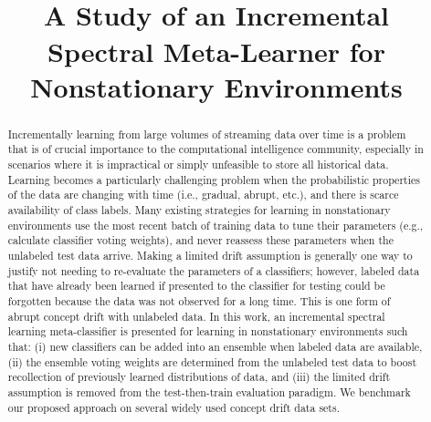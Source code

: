 \documentclass[10pt, conference]{IEEEtran}
\begin{document}
\title{\ \\ \bf \Large  A Study of an Incremental Spectral Meta-Learner for Nonstationary Environments}   
\author{
}
\IEEEoverridecommandlockouts
\maketitle



\begin{abstract}

Incrementally learning from large volumes of streaming data over time is a problem that is of crucial importance to the computational intelligence community, especially in scenarios where it is impractical or simply unfeasible to store all historical data.  Learning  becomes a particularly challenging problem when the probabilistic properties of the data are changing with time (i.e., gradual, abrupt, etc.), and there is scarce availability of class labels.  Many existing strategies for learning in nonstationary environments use the most recent batch of training data to tune their parameters (e.g., calculate classifier voting weights), and never reassess these parameters when the unlabeled test data arrive.  Making a limited drift assumption is generally one way to justify not needing to re-evaluate the parameters of a classifiers; however, labeled data that  have already been learned if presented to the classifier for testing could be forgotten because the data was not observed for a long time. This is one form of abrupt concept drift with unlabeled data.  In this work, an incremental spectral learning meta-classifier is presented for learning in nonstationary environments such that: (i) new classifiers can be added into an ensemble when labeled data are available, (ii) the ensemble voting weights are determined from the unlabeled test data to boost recollection of previously learned distributions of data,  and (iii) the limited drift assumption is removed from the test-then-train evaluation paradigm. We benchmark our proposed approach on several widely used concept drift data sets. 


\end{abstract}

\end{document}
